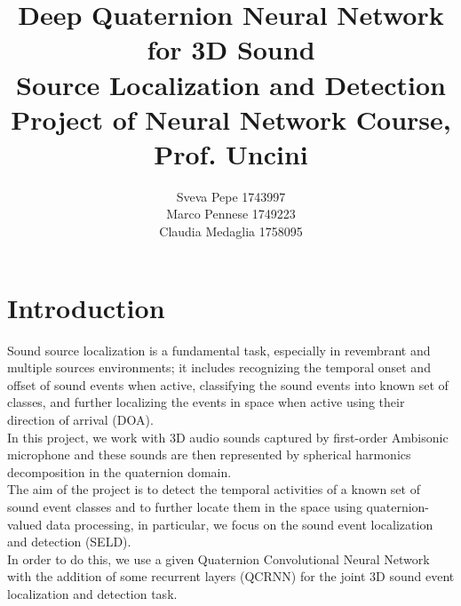 \documentclass{article}
\title{Deep Quaternion Neural Network for 3D Sound \\ Source Localization and Detection
\\ \large{\vspace{0.4cm}Project of Neural Network Course, Prof. Uncini}}
\author{Sveva Pepe 1743997 \\  Marco Pennese 1749223 \\  Claudia Medaglia 1758095}
\date{}
\begin{document}
    \maketitle
    \section{Introduction}
    Sound source localization is a fundamental task, especially in revembrant and multiple sources environments; it includes recognizing the temporal onset and offset of sound events when active, classifying the sound events into known set of classes, and further localizing the events in space when active using their direction of arrival (DOA).\\
    In this project, we work with 3D audio sounds captured by first-order Ambisonic microphone and these sounds are then represented 
    by spherical harmonics decomposition in the quaternion domain.
    \\ The aim of the project is to detect the temporal activities of a known set of sound event classes and to further locate them in 
    the space using quaternion-valued data processing, in particular, we focus on the sound event localization and detection (SELD). 
    \\ In order to do this, we use a given Quaternion Convolutional Neural Network with the addition of some recurrent layers (QCRNN) 
    for the joint 3D sound event localization and detection task.
\end{document}
